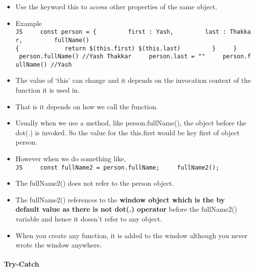 \documentclass[
  paper=a4,
  ,captions=tableheading
]{scrartcl}
\providecommand{\tightlist}{%
  \setlength{\itemsep}{0pt}\setlength{\parskip}{0pt}}
\begin{document}
\begin{itemize}
\tightlist
\item
  Use the keyword this to access other properties of the same object.
\item
  Example
  \texttt{JS\ \ \ \ \ const\ person\ =\ \{\ \ \ \ \ \ \ \ \ first\ :\ \textquotesingle{}Yash\textquotesingle{},\ \ \ \ \ \ \ \ \ last\ :\ \textquotesingle{}Thakkar\textquotesingle{},\ \ \ \ \ \ \ \ \ fullName()\{\ \ \ \ \ \ \ \ \ \ \ \ \ return\ \textasciigrave{}\$(this.first)\ \$(this.last)\textasciigrave{}\ \ \ \ \ \ \ \ \ \}\ \ \ \ \ \}\ \ \ \ \ person.fullName()\ //Yash\ Thakkar\ \ \ \ \ person.last\ =\ ""\ \ \ \ \ person.fullName()\ //Yash}
\item
  The value of `this' can change and it depends on the invocation
  context of the function it is used in.
\item
  That is it depends on how we call the function.
\item
  Usually when we use a method, like person.fullName(), the object
  before the dot(.) is invoked. So the value for the this.first would be
  key first of object person.
\item
  However when we do something like,
  \texttt{JS\ \ \ \ \ const\ fullName2\ =\ person.fullName;\ \ \ \ \ fullName2();}
\item
  The fullName2() does not refer to the person object.
\item
  The fullName2() references to the \textbf{window object which is the
  by default value as there is not dot(.) operator} before the
  fullName2() variable and hence it doesn't refer to any object.
\item
  When you create any function, it is added to the window although you
  never wrote the window anywhere.
\end{itemize}

\hypertarget{try-catch}{%
\paragraph{Try-Catch}\label{try-catch}}
\end{document}
